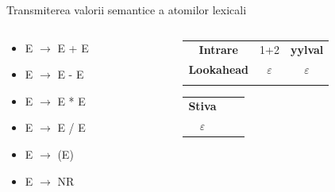 \documentclass[pdf]{beamer}
\begin{document}
\begin{frame}{Transmiterea valorii semantice a atomilor lexicali}
\begin{columns}
\begin{column}{0.5\textwidth}
\begin{itemize}
	\item
	E $\rightarrow$ E + E

	\item
	E $\rightarrow$ E - E

	\item
	E $\rightarrow$ E * E

	\item
	E $\rightarrow$ E / E

	\item
	E $\rightarrow$ (E)

	\item
	E $\rightarrow$ NR

\end{itemize}
\end{column}

\begin{column}{0.4\textwidth}

\begin{tabular}{ccc|} \cline{1-3}
\multicolumn{1}{|c}{\textbf{Intrare}} & {1+2} & {\textbf{yylval}} \\ \cline{1-3}
\multicolumn{1}{|c}{\textbf{Lookahead}} & $\varepsilon$ & $\varepsilon$ \\ \cline{1-3} \\
\end{tabular}
\begin{tabular}{cc|c|}
\cline{1-1}
\multicolumn{1}{|c|}{\textbf{Stiva}} & \hspace{0.75cm}\\
\multicolumn{1}{|c|}{$\varepsilon$} & \hspace{0.75cm}\\
\cline{1-1}
\end{tabular}

\end{column}
\end{columns}
\end{frame}
\end{document}
